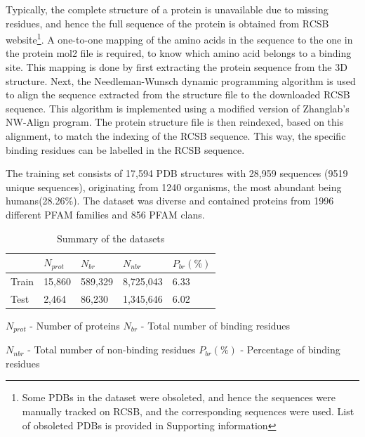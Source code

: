 \documentclass[journal=jacsat,manuscript=article]{achemso}
\begin{document}
Typically, the complete structure of a protein is unavailable due to missing residues, and hence the full sequence of the protein is obtained from RCSB \cite{burley2019rcsb} website\footnote{Some PDBs in the dataset were obsoleted, and hence the sequences were manually tracked on RCSB, and the corresponding sequences were used. List of obsoleted PDBs is provided in Supporting information}. A one-to-one mapping of the amino acids in the sequence to the one in the protein mol2 file is required, to know which amino acid belongs to a binding site. This mapping is done by first extracting the protein sequence from the 3D structure. Next, the Needleman-Wunsch dynamic programming algorithm is used to align the sequence extracted from the structure file to the downloaded RCSB sequence. This algorithm is implemented using a modified version of Zhanglab's NW-Align program\cite{NWAlign}. The protein structure file is then reindexed, based on this alignment, to match the indexing of the RCSB sequence. This way, the specific binding residues can be labelled in the RCSB sequence.


The training set consists of 17,594 PDB structures with 28,959 sequences (9519 unique sequences), originating from 1240 organisms, the most abundant being humans(28.26\%). The dataset was diverse and contained proteins from 1996 different PFAM families and 856 PFAM clans.

\begin{table}
    \centering
    \begin{tabular}{| P{2.75cm} | P{2.75cm} | P{2.75cm} | P{2.75cm} | P{2.75cm} |}
        \hline
              & $N_{prot}$ & $N_{br}$ & $N_{nbr}$ & $P_{br}(\%)$ \\
        \hline
        Train & 15,860     & 589,329  & 8,725,043 & 6.33         \\
        Test  & 2,464      & 86,230   & 1,345,646 & 6.02         \\
        \hline
    \end{tabular}
    \caption{\label{tab:dataset_summary} Summary of the datasets}
    \vspace{5 mm}
    \noindent $N_{prot}$ - Number of proteins \hfill $N_{br}$ - Total number of binding residues

    \vspace{3 mm}

    \noindent $N_{nbr}$ - Total number of non-binding residues \hfill $P_{br}(\%)$ - Percentage of binding residues
\end{table}
\end{document}
